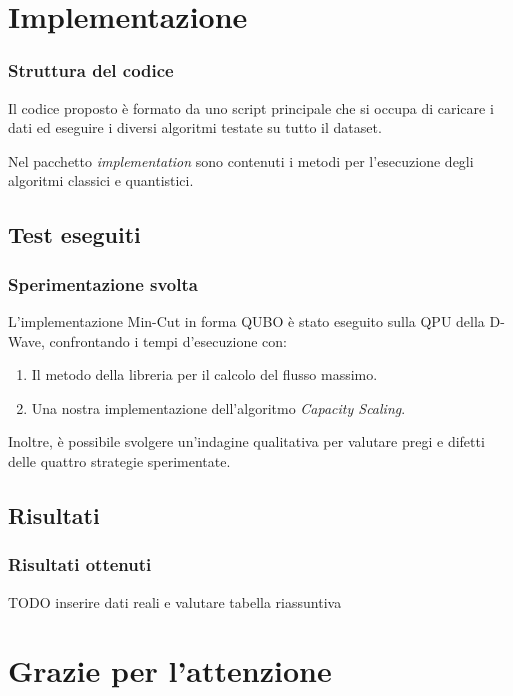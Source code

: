\documentclass[10pt]{beamer}
\begin{document}
\section{Implementazione}
\begin{frame}
  \frametitle{Struttura del codice}

  Il codice proposto è formato da uno script principale che si occupa di caricare i dati ed eseguire i diversi algoritmi testate su tutto il dataset.

  Nel pacchetto \emph{implementation} sono contenuti i metodi per l'esecuzione degli algoritmi classici e quantistici.

\end{frame}
\subsection{Test eseguiti}
\begin{frame}
  \frametitle{Sperimentazione svolta}

  L'implementazione Min-Cut in forma QUBO è stato eseguito sulla QPU della D-Wave, confrontando i tempi d'esecuzione con:
  
  \begin{enumerate}
    \item Il metodo della libreria per il calcolo del flusso massimo.
    \item Una nostra implementazione dell'algoritmo \emph{Capacity Scaling}.
  \end{enumerate} 

  Inoltre, è possibile svolgere un'indagine qualitativa per valutare pregi e difetti delle quattro strategie sperimentate.

\end{frame}
\subsection{Risultati}
\begin{frame}
  \frametitle{Risultati ottenuti}

  TODO inserire dati reali e valutare tabella riassuntiva

  \begin{figure}
  \end{figure}

\end{frame}

\section*{Grazie per l'attenzione}
\end{document}
